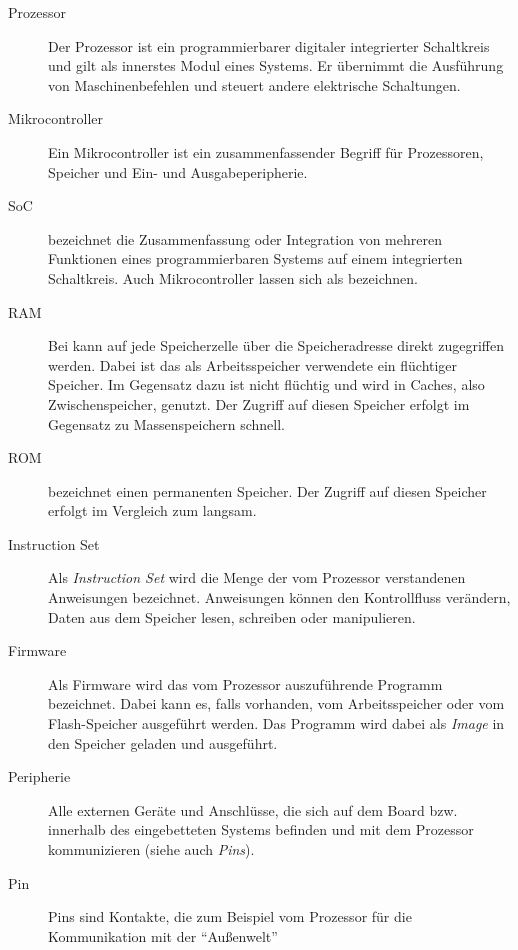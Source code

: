 	    \begin{description}
	        \item[Prozessor] Der Prozessor ist ein programmierbarer digitaler integrierter Schaltkreis und gilt als
	        innerstes Modul eines Systems. Er übernimmt die Ausführung von Maschinenbefehlen und steuert andere
	        elektrische Schaltungen\citep[vgl.~Kap.~1]{Asche2017}.
	        \item[Mikrocontroller] Ein Mikrocontroller ist ein zusammenfassender Begriff für Prozessoren, Speicher und
	        Ein- und Ausgabeperipherie.
	        \item[SoC]  bezeichnet die Zusammenfassung oder Integration von
	        mehreren Funktionen eines programmierbaren Systems auf einem integrierten Schaltkreis. Auch Mikrocontroller
	        lassen sich als  bezeichnen.
	        \item[RAM] Bei  kann auf jede Speicherzelle über die Speicheradresse direkt
	        zugegriffen werden. Dabei ist das als Arbeitsspeicher verwendete  ein
	        flüchtiger Speicher. Im Gegensatz dazu ist  nicht flüchtig und wird in Caches, also Zwischenspeicher,
	        genutzt. Der Zugriff auf diesen Speicher erfolgt im Gegensatz zu Massenspeichern schnell.
	        \item[ROM]  bezeichnet einen permanenten Speicher. Der Zugriff auf diesen
	        Speicher erfolgt im Vergleich zum  langsam.
	        \item[Instruction Set] Als \textit{Instruction Set} wird die Menge der vom Prozessor verstandenen Anweisungen
	        bezeichnet. Anweisungen können den Kontrollfluss verändern, Daten aus dem Speicher lesen, schreiben oder
	        manipulieren\citep[]{Asche2017}.
	        \item[Firmware] Als Firmware wird das vom Prozessor auszuführende Programm bezeichnet. Dabei kann es, falls
	        vorhanden, vom Arbeitsspeicher oder vom Flash-Speicher ausgeführt werden. Das Programm wird dabei als
	        \textit{Image} in den Speicher geladen und ausgeführt.
	        \item[Peripherie] Alle externen Geräte und Anschlüsse, die sich auf dem Board bzw. innerhalb des
	        eingebetteten Systems befinden und mit dem Prozessor kommunizieren (siehe auch \textit{Pins}).
	        \item[Pin] Pins sind Kontakte, die zum Beispiel vom Prozessor für die Kommunikation mit der ``Außenwelt''

\end{description}
